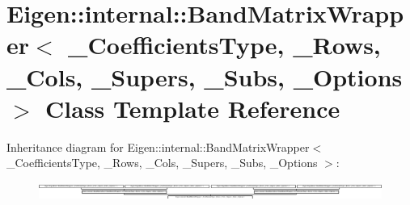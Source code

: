 \hypertarget{class_eigen_1_1internal_1_1_band_matrix_wrapper}{}\section{Eigen\+:\+:internal\+:\+:Band\+Matrix\+Wrapper$<$ \+\_\+\+Coefficients\+Type, \+\_\+\+Rows, \+\_\+\+Cols, \+\_\+\+Supers, \+\_\+\+Subs, \+\_\+\+Options $>$ Class Template Reference}
\label{class_eigen_1_1internal_1_1_band_matrix_wrapper}
Inheritance diagram for Eigen\+:\+:internal\+:\+:Band\+Matrix\+Wrapper$<$ \+\_\+\+Coefficients\+Type, \+\_\+\+Rows, \+\_\+\+Cols, \+\_\+\+Supers, \+\_\+\+Subs, \+\_\+\+Options $>$\+:\begin{figure}[H]
\begin{center}
\leavevmode
\includegraphics[height=0.594059cm]{class_eigen_1_1internal_1_1_band_matrix_wrapper}
\end{center}
\end{figure}
